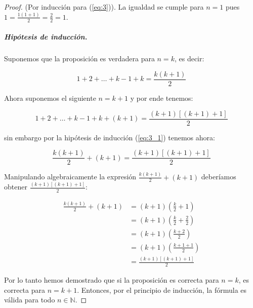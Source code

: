 \documentclass{article}
\begin{document}
\begin{proof}(Por inducción para (\ref{eq:3})). La igualdad se cumple para $n=1$ pues $1 = \frac{1(1+1)}{2} = \frac{2}{2} = 1$.
	
\subparagraph{Hipótesis de inducción.} Suponemos que la proposición es verdadera para $n=k$, es decir:

	\begin{equation}\label{eq:3_1}
		1 + 2 + \dots + k -1 + k = \frac{k(k+1)}{2}
	\end{equation}

Ahora suponemos el siguiente $n = k + 1$ y por ende tenemos:

\[
	1 + 2 + \dots + k - 1 + k + (k + 1) = \frac{(k+1)[(k+1)+1]}{2}
\]	

sin embargo por la hipótesis de inducción (\ref{eq:3_1}) tenemos ahora:

\[
	\frac{k(k+1)}{2} + (k + 1) = \frac{(k+1)[(k+1)+1]}{2}
\]

Manipulando algebraicamente la expresión $\frac{k(k+1)}{2} + (k + 1)$ deberíamos obtener $\frac{(k+1)[(k+1)+1]}{2}$:

\begin{align*}
	\frac{k(k+1)}{2} + (k + 1) &= (k+1)\left(\frac{k}{2} + 1\right)\\
	&= (k+1)\left(\frac{k}{2} + \frac{2}{2}\right)\\
	&= (k+1)\left(\frac{k + 2}{2}\right)\\
	&= (k+1)\left(\frac{k + 1 + 1}{2}\right)\\
	&= \frac{(k+1)[(k + 1) + 1]}{2}
\end{align*}

Por lo tanto hemos demostrado que si la proposición es correcta para $n = k$, es correcta para $n=k+1$. Entonces, por el principio de inducción, la fórmula es válida para todo $n \in \mathbb{N}$.
\end{proof}
\end{document}
